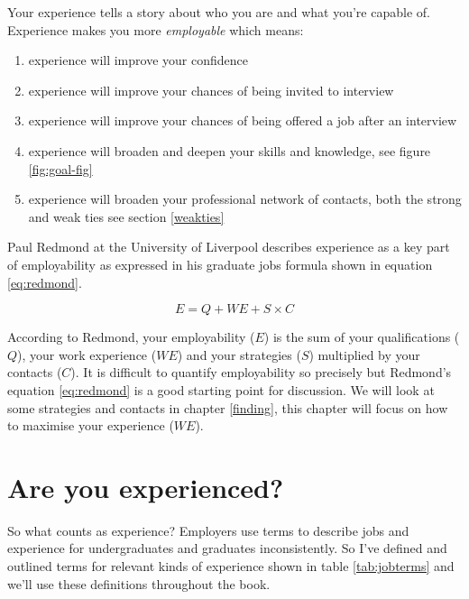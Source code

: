 \documentclass[
]{book}
\providecommand{\tightlist}{%
  \setlength{\itemsep}{0pt}\setlength{\parskip}{0pt}}
\begin{document}
Your experience tells a story about who you are and what you're capable of. Experience makes you more \emph{employable} which means:

\begin{enumerate}
\def\labelenumi{\arabic{enumi}.}
\tightlist
\item
  experience will improve your confidence \citep{jackiecarter}
\item
  experience will improve your chances of being invited to interview
\item
  experience will improve your chances of being offered a job after an interview
\item
  experience will broaden and deepen your skills and knowledge, see figure \ref{fig:goal-fig}
\item
  experience will broaden your professional network of contacts, both the strong and weak ties see section \ref{weakties}
\end{enumerate}

Paul Redmond at the University of Liverpool describes experience as a key part of employability \citep{paulredmond} as expressed in his graduate jobs formula shown in equation \eqref{eq:redmond}.

\begin{equation}
  E = Q + WE + S \times C
  \label{eq:redmond}
\end{equation}

According to Redmond, your employability (\(E\)) is the sum of your qualifications (\(Q\)), your work experience (\(WE\)) and your strategies (\(S\)) multiplied by your contacts (\(C\)). It is difficult to quantify employability so precisely but Redmond's equation \eqref{eq:redmond} is a good starting point for discussion. We will look at some strategies and contacts in chapter \ref{finding}, this chapter will focus on how to maximise your experience (\(WE\)).

\hypertarget{areuexperienced}{%
\section{Are you experienced?}\label{areuexperienced}}

So what counts as experience? Employers use terms to describe jobs and experience for undergraduates and graduates inconsistently. So I've defined and outlined terms for relevant kinds of experience shown in table \ref{tab:jobterms} and we'll use these definitions throughout the book.
\end{document}
